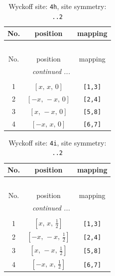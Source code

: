 \documentclass[fleqn,8pt]{jsarticle}
\begin{document}
\begin{longtable}{ccc}
\caption{Wyckoff site: {\tt 4h}, site symmetry: {\tt ..2}}
 \\
 \hline \hline
No. & position & mapping \\ \hline \endfirsthead

\multicolumn{2}{l}{\tablename\ \thetable{}} \\
 \hline \hline
No. & position & mapping \\ \hline \endhead

 \hline \hline
\multicolumn{2}{r}{\footnotesize\it continued ...} \\ \endfoot

 \hline \hline
\multicolumn{2}{r}{} \\ \endlastfoot

1 & $\left[ x,\, x,\, 0 \right]$ & {\tt [1,3]} \\ \hline
2 & $\left[ - x,\, - x,\, 0 \right]$ & {\tt [2,4]} \\ \hline
3 & $\left[ x,\, - x,\, 0 \right]$ & {\tt [5,8]} \\ \hline
4 & $\left[ - x,\, x,\, 0 \right]$ & {\tt [6,7]} \\
\end{longtable}
\renewcommand{\arraystretch}{1.2}
\begin{longtable}{ccc}
\caption{Wyckoff site: {\tt 4i}, site symmetry: {\tt ..2}}
 \\
 \hline \hline
No. & position & mapping \\ \hline \endfirsthead

\multicolumn{2}{l}{\tablename\ \thetable{}} \\
 \hline \hline
No. & position & mapping \\ \hline \endhead

 \hline \hline
\multicolumn{2}{r}{\footnotesize\it continued ...} \\ \endfoot

 \hline \hline
\multicolumn{2}{r}{} \\ \endlastfoot

1 & $\left[ x,\, x,\, \frac{1}{2} \right]$ & {\tt [1,3]} \\ \hline
2 & $\left[ - x,\, - x,\, \frac{1}{2} \right]$ & {\tt [2,4]} \\ \hline
3 & $\left[ x,\, - x,\, \frac{1}{2} \right]$ & {\tt [5,8]} \\ \hline
4 & $\left[ - x,\, x,\, \frac{1}{2} \right]$ & {\tt [6,7]} \\
\end{longtable}
\end{document}

